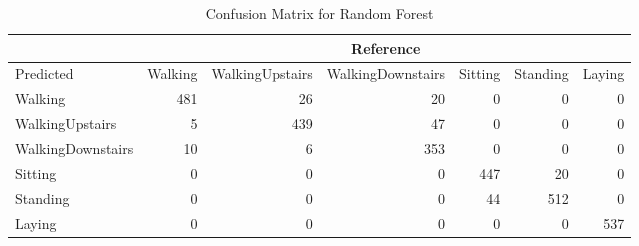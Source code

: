 \begin{table}[ht]
\begin{adjustwidth}{-1in}{-1in}
\centering
\caption{Confusion Matrix for Random Forest} 
\label{tab:conmat_rf}
\begin{tabular}{l|rrrrrr}
  &\multicolumn{6}{c}{Reference}\\
 \hline
Predicted & Walking & WalkingUpstairs & WalkingDownstairs & Sitting & Standing & Laying \\ 
  \hline
Walking & 481 &  26 &  20 &   0 &   0 &   0 \\ 
  WalkingUpstairs &   5 & 439 &  47 &   0 &   0 &   0 \\ 
  WalkingDownstairs &  10 &   6 & 353 &   0 &   0 &   0 \\ 
  Sitting &   0 &   0 &   0 & 447 &  20 &   0 \\ 
  Standing &   0 &   0 &   0 &  44 & 512 &   0 \\ 
  Laying &   0 &   0 &   0 &   0 &   0 & 537 \\ 
   \hline
\end{tabular}
\end{adjustwidth}
\end{table}

